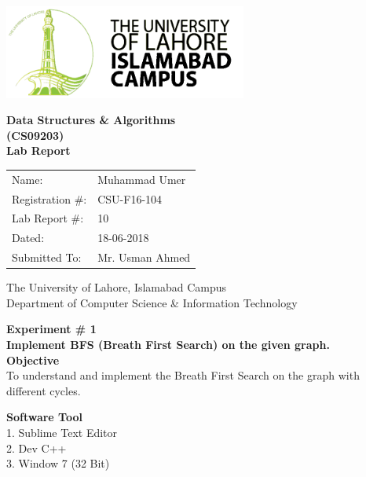 \documentclass[11pt]{article}            %
\begin{document}
\begin{titlepage}
    \centering
  \vfill
    \includegraphics[width=8cm]{uni_logo.png} \\ 
	\vskip2cm
    {\bfseries\Large
	Data Structures  \& Algorithms \\ (CS09203)\\
	
	\vskip2cm
	Lab Report 
	 
	\vskip2cm
	}    

\begin{center}
\begin{tabular}{ l l  } 

Name: & Muhammad Umer \\ 
Registration \#: & CSU-F16-104 \\ 
Lab Report \#: & 10 \\ 
 Dated:& 18-06-2018\\ 
Submitted To:& Mr. Usman Ahmed\\ 

\end{tabular}
\end{center}
    \vfill
    The University of Lahore, Islamabad Campus\\
Department of Computer Science \& Information Technology
\end{titlepage}


    
    {\bfseries\Large
\centering
	Experiment \# 1 \\

Implement BFS (Breath First Search) on the given graph.\\
	
	}    
 \vskip1cm
 \textbf {Objective}\\  To understand and implement the Breath First Search on the graph with different cycles.
 
 \textbf {Software Tool} \\
1. Sublime Text Editor\\
2. Dev C++\\
3. Window 7 (32 Bit)\\
\end{document}
